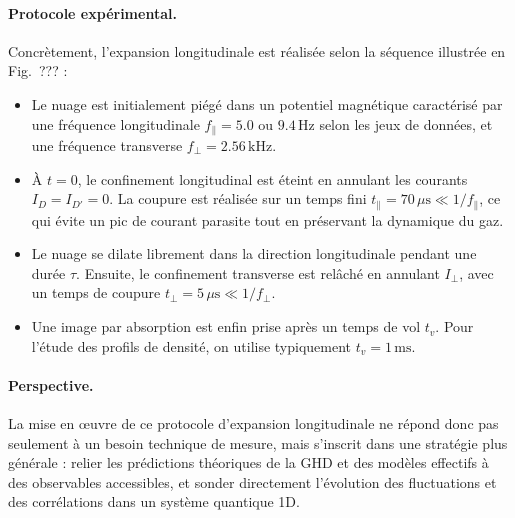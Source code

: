 \paragraph{Protocole expérimental.}
Concrètement, l’expansion longitudinale est réalisée selon la séquence illustrée en Fig.~??? :
\begin{itemize}
  \item Le nuage est initialement piégé dans un potentiel magnétique caractérisé par une fréquence longitudinale $f_{\parallel} = 5.0$ ou $9.4\,\mathrm{Hz}$ selon les jeux de données, et une fréquence transverse $f_{\perp} = 2.56\,\mathrm{kHz}$.
  \item À $t=0$, le confinement longitudinal est éteint en annulant les courants $I_D=I_{D'}=0$. La coupure est réalisée sur un temps fini $t_{\parallel} = 70\,\mu\mathrm{s} \ll 1/f_{\parallel}$, ce qui évite un pic de courant parasite tout en préservant la dynamique du gaz.
  \item Le nuage se dilate librement dans la direction longitudinale pendant une durée $\tau$. Ensuite, le confinement transverse est relâché en annulant $I_{\perp}$, avec un temps de coupure $t_{\perp} = 5\,\mu\mathrm{s} \ll 1/f_{\perp}$.
  \item Une image par absorption est enfin prise après un temps de vol $t_v$. Pour l’étude des profils de densité, on utilise typiquement $t_v = 1\,\mathrm{ms}$.
\end{itemize}


\paragraph{Perspective.}
La mise en œuvre de ce protocole d’expansion longitudinale ne répond donc pas seulement à un besoin technique de mesure, mais s’inscrit dans une stratégie plus générale : relier les prédictions théoriques de la GHD et des modèles effectifs à des observables accessibles, et sonder directement l’évolution des fluctuations et des corrélations dans un système quantique 1D.

